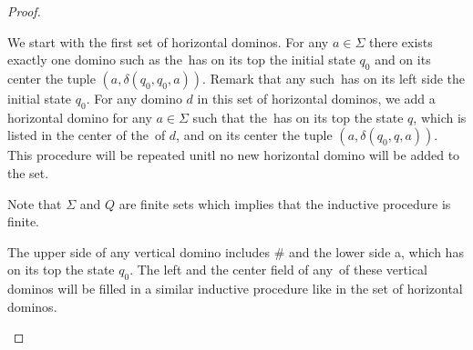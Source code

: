 \begin{proof}
\begin{compactenum}[(I)]
We start with the first set of horizontal dominos. For any $a\in\Sigma$ there exists exactly one
domino such as the\mirroredL~has on its top the initial state $q_0$ and on its center the tuple $(a,
\delta(q_0, q_0, a))$. Remark that any such\mirroredL~has on its left side the initial state $q_0$. 
For any domino $d$ in this set of horizontal dominos, we add a horizontal domino for any
$a\in\Sigma$ such that the\mirroredL~has on its top the state $q$, which is listed in
the center of the\mirroredL~of $d$, and on its center the tuple $(a, \delta(q_0, q, a))$. This
procedure will be repeated unitl no new horizontal domino will be added to the set.

Note that $\Sigma$ and $Q$ are finite sets which implies that the inductive procedure is
finite.

The upper side of any vertical domino includes $\#$ and the lower side a\mirroredL, which has on its
top the state $q_0$. The left and the center field of any\mirroredL~of these vertical dominos will
be filled in a similar inductive procedure like in the set of horizontal dominos. 


\end{compactenum}
\end{proof}
